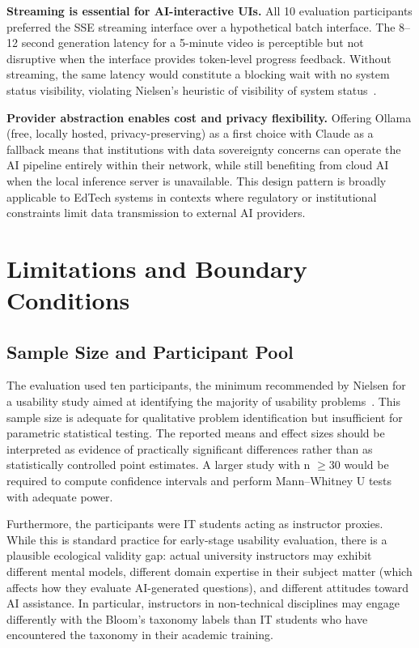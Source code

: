 \textbf{Streaming is essential for AI-interactive UIs.} All 10 evaluation
participants preferred the SSE streaming interface over a hypothetical batch
interface. The 8--12 second generation latency for a 5-minute video is
perceptible but not disruptive when the interface provides token-level
progress feedback. Without streaming, the same latency would constitute a
blocking wait with no system status visibility, violating Nielsen's
heuristic of visibility of system status~\cite{nielsen1994}.

\textbf{Provider abstraction enables cost and privacy flexibility.}
Offering Ollama (free, locally hosted, privacy-preserving) as a first
choice with Claude as a fallback means that institutions with data
sovereignty concerns can operate the AI pipeline entirely within their
network, while still benefiting from cloud AI when the local inference
server is unavailable. This design pattern is broadly applicable to
EdTech systems in contexts where regulatory or institutional constraints
limit data transmission to external AI providers.

\section{Limitations and Boundary Conditions}

\subsection{Sample Size and Participant Pool}

The evaluation used ten participants, the minimum recommended by Nielsen
for a usability study aimed at identifying the majority of usability
problems~\cite{nielsen1994}. This sample size is adequate for qualitative
problem identification but insufficient for parametric statistical testing.
The reported means and effect sizes should be interpreted as evidence of
practically significant differences rather than as statistically controlled
point estimates. A larger study with n $\geq 30$ would be required to
compute confidence intervals and perform Mann--Whitney U tests with
adequate power.

Furthermore, the participants were IT students acting as instructor proxies.
While this is standard practice for early-stage usability evaluation, there
is a plausible ecological validity gap: actual university instructors may
exhibit different mental models, different domain expertise in their subject
matter (which affects how they evaluate AI-generated questions), and
different attitudes toward AI assistance. In particular, instructors in
non-technical disciplines may engage differently with the Bloom's taxonomy
labels than IT students who have encountered the taxonomy in their academic
training.

